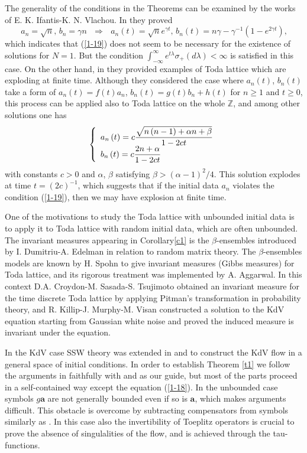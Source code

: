 \documentclass[a4paper]{article}%
\begin{document}
The generality of the conditions in the Theorems can be examined by the works
of E. K. Ifantis-K. N. Vlachou. In \cite{iv} they proved%
\[
a_{n}=\sqrt{n}\text{, \ }b_{n}=\gamma n\text{ }\Longrightarrow\text{ }%
a_{n}\left(  t\right)  =\sqrt{n}e^{\gamma t}\text{, \ }b_{n}\left(  t\right)
=n\gamma-\gamma^{-1}\left(  1-e^{2\gamma t}\right)  \text{,}%
\]
which indicates that (\ref{1-19}) does not seem to be necessary for the
existence of solutions for $N=1$. But the condition $\int_{-\infty}^{\infty
}e^{t\lambda}\sigma_{+}\left(  d\lambda\right)  <\infty$ is satisfied in this
case. On the other hand, in \cite{iv2} they provided examples of Toda lattice
which are exploding at finite time. Although they considered the case where
$a_{n}\left(  t\right)  $, $b_{n}\left(  t\right)  $ take a form of
$a_{n}\left(  t\right)  =f(t)a_{n}$, $b_{n}\left(  t\right)  =g(t)b_{n}+h(t)$
for $n\geq1$ and $t\geq0$, this process can be applied also to Toda lattice on
the whole $\mathbb{Z}$, and among other solutions one has
\[
\left\{
\begin{array}
[c]{l}%
a_{n}\left(  t\right)  =c\dfrac{\sqrt{n\left(  n-1\right)  +\alpha n+\beta}%
}{1-2ct}\\
b_{n}\left(  t\right)  =c\dfrac{2n+\alpha}{1-2ct}%
\end{array}
\right.
\]
with constants $c>0$ and $\alpha$, $\beta$ satisfying $\beta>\left(
\alpha-1\right)  ^{2}/4$. This solution explodes at time $t=\left(  2c\right)
^{-1}$, which suggests that if the initial data $a_{n}$ violates the condition
(\ref{1-19}), then we may have explosion at finite time.

One of the motivations to study the Toda lattice with unbounded initial data
is to apply it to Toda lattice with random initial data, which are often
unbounded. The invariant measures appearing in Corollary\ref{c1} is the
$\beta$-ensembles introduced by I. Dumitriu-A. Edelman\cite{d} in relation to
random matrix theory. The $\beta$-ensembles models are known by H.
Spohn\cite{sp} to give invariant measures (Gibbs measures) for Toda lattice,
and its rigorous treatment was implemented by A. Aggarwal\cite{a}. In this
context D.A. Croydon-M. Sasada-S. Tsujimoto\cite{c} obtained an invariant
measure for the time discrete Toda lattice by applying Pitman's transformation
in probability theory, and R. Killip-J. Murphy-M. Visan\cite{kmv} constructed
a solution to the KdV equation starting from Gaussian white noise and proved
the induced measure is invariant under the equation.

In the KdV case SSW theory was extended in \cite{k} and \cite{k2} to construct
the KdV flow in a general space of initial conditions. In order to establish
Theorem \ref{t1} we follow the arguments in \cite{z} faithfully with \cite{k}
and \cite{k2} as our guide, but most of the parts proceed in a self-contained
way except the equation (\ref{1-18}). In the unbounded case symbols
$g\boldsymbol{a}$ are not generally bounded even if so is $\boldsymbol{a}$,
which makes arguments difficult. This obstacle is overcome by subtracting
compensators from symbols similarly as \cite{k}. In this case also the
invertibility of Toeplitz operators is crucial to prove the absence of
singulalities of the flow, and is achieved through the tau-functions.
\end{document}

